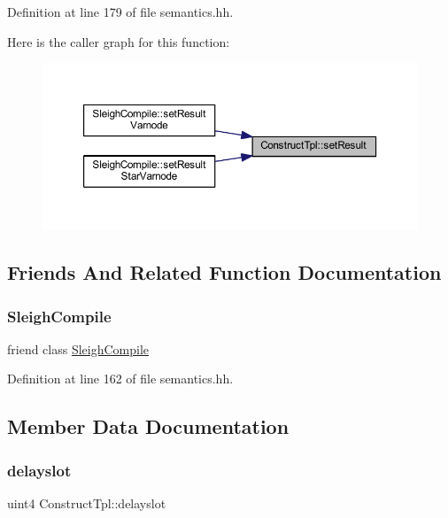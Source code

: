 Definition at line 179 of file semantics.\+hh.

Here is the caller graph for this function\+:
\nopagebreak
\begin{figure}[H]
\begin{center}
\leavevmode
\includegraphics[width=350pt]{class_construct_tpl_af07c1652b17290409b235a235001424f_icgraph}
\end{center}
\end{figure}


\subsection{Friends And Related Function Documentation}
\mbox{\label{class_construct_tpl_a327c0b989084ddb923468b1440a055de}} 
\subsubsection{\texorpdfstring{SleighCompile}{SleighCompile}}
{\footnotesize\ttfamily friend class \mbox{\hyperlink{class_sleigh_compile}{Sleigh\+Compile}}\hspace{0.3cm}{\ttfamily [friend]}}



Definition at line 162 of file semantics.\+hh.



\subsection{Member Data Documentation}
\mbox{\label{class_construct_tpl_a5db8bfa128cfbf7955169d18cf9510cd}} 
\subsubsection{\texorpdfstring{delayslot}{delayslot}}
{\footnotesize\ttfamily uint4 Construct\+Tpl\+::delayslot\hspace{0.3cm}{\ttfamily [protected]}}



